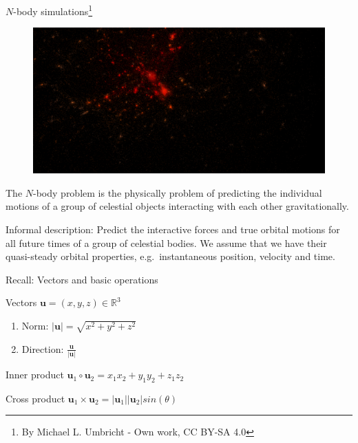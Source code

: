 \documentclass[12pt,t]{beamer}
\begin{document}
\begin{frame}{$N$-body simulations\footnote{\tiny By Michael L. Umbricht - Own work, CC BY-SA 4.0}}

\begin{figure}
\includegraphics[width=0.5\linewidth]{./images/Galaxy_cluster_sim.png}
\end{figure}


The $N$-body problem is the physically problem of predicting the individual motions of a group of celestial objects interacting with each other gravitationally.

\begin{block}{Informal description:}
Predict the interactive forces and true orbital motions for all future times of a group of celestial bodies. We assume that we have their quasi-steady orbital properties, e.g.\ instantaneous position, velocity and time.
\end{block}

\end{frame}


\begin{frame}{Recall: Vectors and basic operations}


\begin{block}{Vectors}
\centering
$\mathbf{u}=(x,y,z)\in \mathbb{R}^3$\\
\begin{enumerate}
\item Norm: $\vert \mathbf{u} \vert = \sqrt{x^2+y^2+z^2}$
\item Direction: $\frac{\mathbf{u}}{\vert \mathbf{u}\vert}$
\end{enumerate}
\end{block}
\begin{block}{Inner product}
\centering
$\mathbf{u}_1 \circ \mathbf{u}_2 = x_1x_2 + y_1y_2 + z_1z_2 $
\end{block}
\begin{block}{Cross product}
\centering
$\mathbf{u}_1 \times \mathbf{u}_2 = \vert\mathbf{u}_1 \vert \vert\mathbf{u}_2 \vert sin(\theta)  $
\end{block}

\end{frame}
\end{document}
